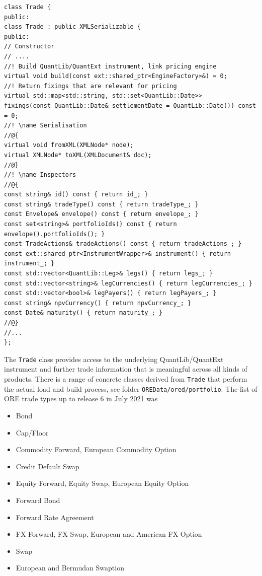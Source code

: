 \documentclass[12pt, a4paper]{report}
\begin{document}
\begin{listing}[H]
\begin{verbatim}
class Trade {
public:
class Trade : public XMLSerializable {
public:
// Constructor
// ....
//! Build QuantLib/QuantExt instrument, link pricing engine
virtual void build(const ext::shared_ptr<EngineFactory>&) = 0;
//! Return fixings that are relevant for pricing
virtual std::map<std::string, std::set<QuantLib::Date>>
fixings(const QuantLib::Date& settlementDate = QuantLib::Date()) const = 0;
//! \name Serialisation
//@{
virtual void fromXML(XMLNode* node);
virtual XMLNode* toXML(XMLDocument& doc);
//@}
//! \name Inspectors
//@{
const string& id() const { return id_; }
const string& tradeType() const { return tradeType_; }
const Envelope& envelope() const { return envelope_; }
const set<string>& portfolioIds() const { return envelope().portfolioIds(); }
const TradeActions& tradeActions() const { return tradeActions_; }
const ext::shared_ptr<InstrumentWrapper>& instrument() { return instrument_; }
const std::vector<QuantLib::Leg>& legs() { return legs_; }
const std::vector<string>& legCurrencies() { return legCurrencies_; }
const std::vector<bool>& legPayers() { return legPayers_; }
const string& npvCurrency() { return npvCurrency_; }
const Date& maturity() { return maturity_; }
//@}
//...
};
\end{verbatim}
\caption{Excerpt of the Trade class showing essential member functions.}
\label{1st:trade}
\end{listing}

The {\tt Trade} class provides access to the underlying QuantLib/QuantExt instrument and further trade information that is meaningful across all kinds of products. There is a range of concrete classes derived from {\tt Trade} that perform the actual load and build process, see folder {\tt OREData/ored/portfolio}. The list of ORE trade types up to release 6 in July 2021 was
\begin{itemize}
\item Bond
\item Cap/Floor
\item Commodity Forward, European Commodity Option
\item Credit Default Swap
\item Equity Forward, Equity Swap, European Equity Option
\item Forward Bond
\item Forward Rate Agreement
\item FX Forward, FX Swap, European and American FX Option
\item Swap
\item European and Bermudan Swaption
\end{itemize}
\end{document}
